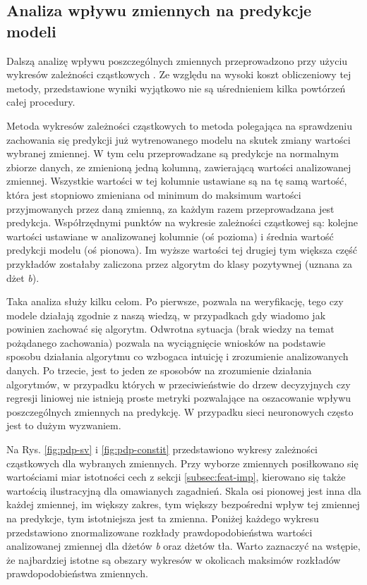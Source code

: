 \FloatBarrier
\subsection{Analiza wpływu zmiennych na predykcje modeli}

Dalszą analizę wpływu poszczególnych zmiennych przeprowadzono przy użyciu wykresów zależności cząstkowych . Ze względu na wysoki koszt obliczeniowy tej metody, przedstawione wyniki wyjątkowo nie są uśrednieniem kilka powtórzeń całej procedury.

Metoda wykresów zależności cząstkowych to metoda polegająca na sprawdzeniu zachowania się predykcji już wytrenowanego modelu na skutek zmiany wartości wybranej zmiennej. W tym celu przeprowadzane są predykcje na normalnym zbiorze danych, ze zmienioną jedną kolumną, zawierającą wartości analizowanej zmiennej. Wszystkie wartości w tej kolumnie ustawiane są na tę samą wartość, która jest stopniowo zmieniana od minimum do maksimum wartości przyjmowanych przez daną zmienną, za każdym razem przeprowadzana jest predykcja. Współrzędnymi punktów na wykresie zależności cząstkowej są: kolejne wartości ustawiane w analizowanej kolumnie (oś pozioma) i średnia wartość predykcji modelu (oś pionowa). Im wyższe wartości tej drugiej tym większa część przykładów zostałaby zaliczona przez algorytm do klasy pozytywnej (uznana za dżet \textit{b}).

Taka analiza służy kilku celom. 
Po pierwsze, pozwala na weryfikację, tego czy modele działają zgodnie z naszą wiedzą, w przypadkach gdy wiadomo jak powinien zachować się algorytm. 
Odwrotna sytuacja (brak wiedzy na temat pożądanego zachowania) pozwala na wyciągnięcie wniosków na podstawie sposobu działania algorytmu co wzbogaca intuicję i zrozumienie analizowanych danych.
Po trzecie, jest to jeden ze sposobów na zrozumienie działania algorytmów, w przypadku których w przeciwieństwie do drzew decyzyjnych czy regresji liniowej nie istnieją proste metryki pozwalające na oszacowanie wpływu poszczególnych zmiennych na predykcję. W przypadku sieci neuronowych często jest to dużym wyzwaniem.

Na Rys. \ref{fig:pdp-sv} i \ref{fig:pdp-constit} przedstawiono wykresy zależności cząstkowych dla wybranych zmiennych. Przy wyborze zmiennych posiłkowano się wartościami miar istotności cech z sekcji \ref{subsec:feat-imp}, kierowano się także wartością ilustracyjną dla omawianych zagadnień.
Skala osi pionowej jest inna dla każdej zmiennej, im większy zakres, tym większy bezpośredni wpływ tej zmiennej na predykcje, tym istotniejsza jest ta zmienna.
Poniżej każdego wykresu przedstawiono znormalizowane rozkłady prawdopodobieństwa wartości analizowanej zmiennej dla dżetów \textit{b} oraz dżetów tła.
Warto zaznaczyć na wstępie, że najbardziej istotne są obszary wykresów w okolicach maksimów rozkładów prawdopodobieństwa zmiennych.


